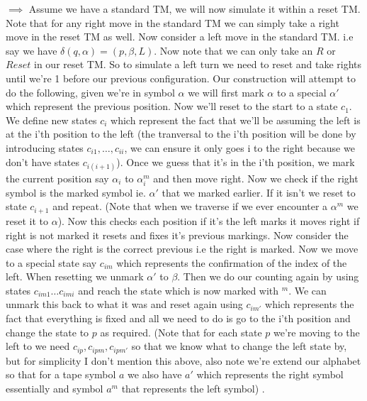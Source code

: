 \documentclass[11pt]{article}
\begin{document}
\begin{enumerate}
\begin{answer}
    $\implies$ Assume we have a standard TM, we will now simulate it within a reset TM. Note that for any right move in the standard TM we can simply take a right move in the reset TM as well. Now consider a left move in the standard TM. i.e say we have $\delta(q, \alpha) =(p, \beta, L)$. Now note that we can only take an $R$ or $Reset$ in our reset TM. So to simulate a left turn we need to reset and take rights until we're 1 before our previous configuration. Our construction will attempt to do the following, given we're in symbol $\alpha$ we will first mark $\alpha$ to a special $\alpha'$ which represent the previous position. Now we'll reset to the start to a state $c_1$. We define new states $c_i$ which represent the fact that we'll be assuming the left is at the i'th position to the left (the tranversal to the i'th position will be done by introducing states $c_{i1}, \dots, c_{ii}$, we can ensure it only goes i to the right because we don't have states $c_{i (i + 1)}$). Once we guess that it's in the i'th position, we mark the current position say $\alpha_{i}$ to $\alpha_{i}^{m}$ and then move right. Now we check if the right symbol is the marked symbol ie. $\alpha'$ that we marked earlier. If it isn't we reset to state $c_{i + 1}$ and repeat. (Note that when we traverse if we ever encounter a $\alpha^{m}$ we reset it to $\alpha$). Now this checks each position if it's the left marks it moves right if right is not marked it resets and fixes it's previous markings. Now consider the case where the right is the correct previous i.e the right is marked. Now we move to a special state say $c_{im}$ which represents the confirmation of the index of the left. When resetting we unmark $\alpha'$ to $\beta$. Then we do our counting again by using states $c_{im 1} \dots c_{im i}$ and reach the state which is now marked with $^{m}$. We can unmark this back to what it was and reset again using $c_{im'}$ which represents the fact that everything is fixed and all we need to do is go to the i'th position and change the state to $p$ as required. (Note that for each state $p$ we're moving to the left to we need $c_{ip}, c_{ipm}, c_{ipm'}$ so that we know what to change the left state by, but for simplicity I don't mention this above, also note we're extend our alphabet so that for a tape symbol $a$ we also have $a'$ which represents the right symbol essentially and symbol $a^{m}$ that represents the left symbol) .
    \vspace{1em}
    

\end{answer}
\end{enumerate}
\end{document}
